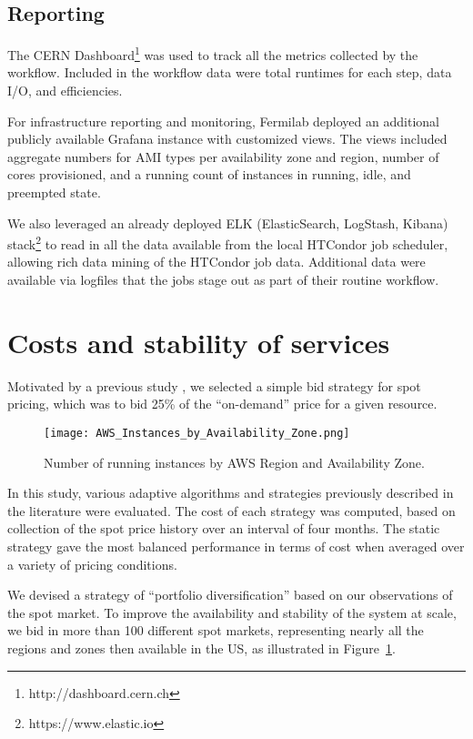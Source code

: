 \documentclass[twocolumn]{svjour3}          %
\begin{document}
\subsection{Reporting}
The CERN Dashboard\footnote{http://dashboard.cern.ch} was used to track all the metrics collected by the workflow. Included in the workflow data were total runtimes for each step, data I/O, and efficiencies.

For infrastructure reporting and monitoring, Fermilab deployed an additional publicly available Grafana instance with customized views.
The views included aggregate numbers for AMI types per availability zone and region, number of cores provisioned, and a running count of instances in running, idle, and preempted state.

We also leveraged an already deployed ELK (ElasticSearch, LogStash, Kibana) stack\footnote{https://www.elastic.io} to read in all the data available from the local HTCondor job scheduler, allowing rich data mining of the HTCondor job data. Additional data were available via logfiles that the jobs stage out as part of their routine workflow.


\section{Costs and stability of services}

Motivated by a previous study \cite{Wu}, we selected a simple bid strategy for spot pricing, which was to bid 25\% of the ``on-demand'' price for a given resource.

\begin{figure}
\centering
 \texttt{[image: AWS\_Instances\_by\_Availability\_Zone.png]}
\caption{\label{fig:zones}Number of running instances by AWS Region and Availability Zone.}
\end{figure}

In this study, various adaptive algorithms and strategies previously described in the literature were evaluated. The cost of each strategy was
computed, based on collection of the spot price history over an interval of four months.  The static strategy gave the most balanced performance in terms of cost
when averaged over a variety of pricing conditions.

We devised a strategy of ``portfolio diversification'' based on our observations of the spot market. To improve the availability and
stability of the system at scale, we bid in more than 100 different spot markets, representing nearly all the regions and zones then available in the US, as illustrated in Figure~\ref{fig:zones}.
\end{document}
